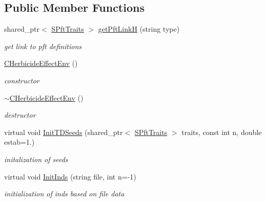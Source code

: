 \subsection*{Public Member Functions}
\begin{DoxyCompactItemize}
\item 
shared\+\_\+ptr$<$ \mbox{\hyperlink{class_s_pft_traits}{S\+Pft\+Traits}} $>$ \mbox{\hyperlink{class_c_herbicide_effect_env_a8377e1b8408118491b7822e92c1bf87e}{get\+Pft\+LinkH}} (string type)
\begin{DoxyCompactList}\small\item\em get link to pft definitions \end{DoxyCompactList}\item 
\mbox{\label{class_c_herbicide_effect_env_a1e3eefe650a003c1677f359654615062}} 
\mbox{\hyperlink{class_c_herbicide_effect_env_a1e3eefe650a003c1677f359654615062}{C\+Herbicide\+Effect\+Env}} ()
\begin{DoxyCompactList}\small\item\em constructor \end{DoxyCompactList}\item 
\mbox{\label{class_c_herbicide_effect_env_a94c7b9988c21de1f06feec7cfd01eade}} 
\mbox{\hyperlink{class_c_herbicide_effect_env_a94c7b9988c21de1f06feec7cfd01eade}{$\sim$\+C\+Herbicide\+Effect\+Env}} ()
\begin{DoxyCompactList}\small\item\em destructor \end{DoxyCompactList}\item 
virtual void \mbox{\hyperlink{class_c_herbicide_effect_env_a5eda0374f9c03399979b1c41a8539933}{Init\+T\+D\+Seeds}} (shared\+\_\+ptr$<$ \mbox{\hyperlink{class_s_pft_traits}{S\+Pft\+Traits}} $>$ traits, const int n, double estab=1.)
\begin{DoxyCompactList}\small\item\em initalization of seeds \end{DoxyCompactList}\item 
virtual void \mbox{\hyperlink{class_c_herbicide_effect_env_a4382fa3250eb3b44613707fdffd77838}{Init\+Inds}} (string file, int n=-\/1)
\begin{DoxyCompactList}\small\item\em initialization of inds based on file data \end{DoxyCompactList}\item 

\end{DoxyCompactItemize}

